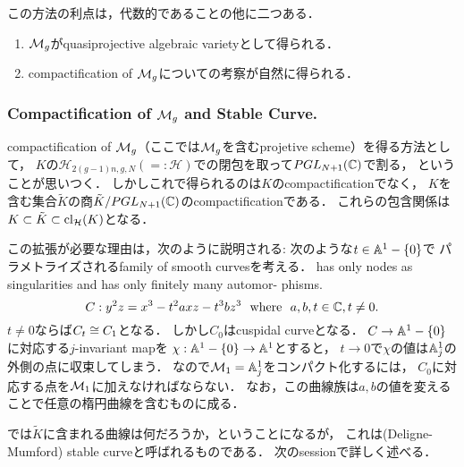 \documentclass[a4paper]{jsarticle}
\newcommand{\modH}{\mathcal{H}}
\begin{document}
    この方法の利点は，代数的であることの他に二つある．
    \begin{enumerate}
        \item $\mathcal{M}_g$がquasiprojective algebraic varietyとして得られる．
        \item compactification of $\mathcal{M}_g$についての考察が自然に得られる．
    \end{enumerate}

    \subsubsection{Compactification of $\mathcal{M}_g$ and Stable Curve.}
    compactification of $\mathcal{M}_g$（ここでは$\mathcal{M}_g$を含むprojetive scheme）を得る方法として，
    $K$の$\modH_{2(g-1)n, g, N}(=:\modH)$での閉包を取って$PGL_{N+1}(\mathbb{C})$で割る，
    ということが思いつく．
    しかしこれで得られるのは$K$のcompactificationでなく，
    $K$を含む集合$\tilde{K}$の商$\tilde{K}/PGL_{N+1}(\mathbb{C})$のcompactificationである．
    これらの包含関係は$K \subset \tilde{K} \subset \cl_{\modH}(K)$となる．
    
    この拡張が必要な理由は，次のように説明される:
    次のような$t \in \mathbb{A}^1-\{0\}$で
    パラメトライズされるfamily of smooth curvesを考える．
    has only nodes as singularities and has only finitely many automor-
    phisms.
    \[ C: y^2z=x^3-t^2axz-t^3bz^3 ~~\text{where}~~ a,b,t \in \mathbb{C}, t \neq 0. \]
    $t \neq 0$ならば$C_t \cong C_1$となる．
    しかし$C_0$はcuspidal curveとなる．
    $C \to \mathbb{A}^1-\{0\}$に対応する$j$-invariant mapを
    $\chi: \mathbb{A}^1-\{0\} \to \mathbb{A}^1$とすると，
    $t \to 0$で$\chi$の値は$\mathbb{A}^1_j$の外側の点に収束してしまう．
    なので$\mathcal{M}_1=\mathbb{A}^1_j$をコンパクト化するには，
    $C_0$に対応する点を$\mathcal{M}_1$に加えなければならない．
    なお，この曲線族は$a,b$の値を変えることで任意の楕円曲線を含むものに成る．

    では$\tilde{K}$に含まれる曲線は何だろうか，ということになるが，
    これは(Deligne-Mumford) stable curveと呼ばれるものである．
    次のsessionで詳しく述べる．



\end{document}
